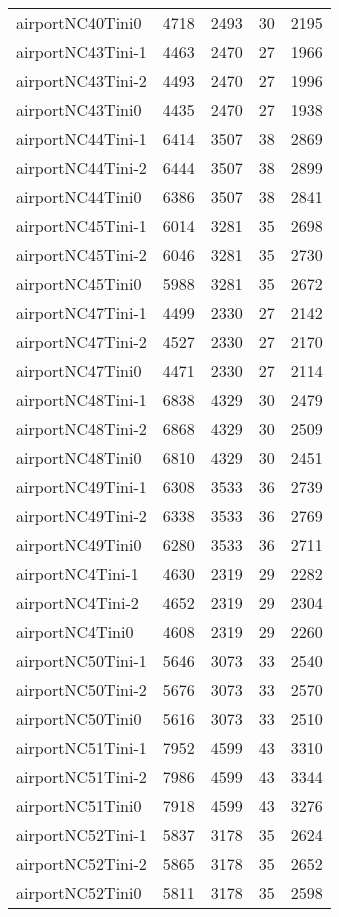 \begin{longtable}{lrrrr}
airportNC40Tini0 & 4718 & 2493 & 30 & 2195 \\
airportNC43Tini-1 & 4463 & 2470 & 27 & 1966 \\
airportNC43Tini-2 & 4493 & 2470 & 27 & 1996 \\
airportNC43Tini0 & 4435 & 2470 & 27 & 1938 \\
airportNC44Tini-1 & 6414 & 3507 & 38 & 2869 \\
airportNC44Tini-2 & 6444 & 3507 & 38 & 2899 \\
airportNC44Tini0 & 6386 & 3507 & 38 & 2841 \\
airportNC45Tini-1 & 6014 & 3281 & 35 & 2698 \\
airportNC45Tini-2 & 6046 & 3281 & 35 & 2730 \\
airportNC45Tini0 & 5988 & 3281 & 35 & 2672 \\
airportNC47Tini-1 & 4499 & 2330 & 27 & 2142 \\
airportNC47Tini-2 & 4527 & 2330 & 27 & 2170 \\
airportNC47Tini0 & 4471 & 2330 & 27 & 2114 \\
airportNC48Tini-1 & 6838 & 4329 & 30 & 2479 \\
airportNC48Tini-2 & 6868 & 4329 & 30 & 2509 \\
airportNC48Tini0 & 6810 & 4329 & 30 & 2451 \\
airportNC49Tini-1 & 6308 & 3533 & 36 & 2739 \\
airportNC49Tini-2 & 6338 & 3533 & 36 & 2769 \\
airportNC49Tini0 & 6280 & 3533 & 36 & 2711 \\
airportNC4Tini-1 & 4630 & 2319 & 29 & 2282 \\
airportNC4Tini-2 & 4652 & 2319 & 29 & 2304 \\
airportNC4Tini0 & 4608 & 2319 & 29 & 2260 \\
airportNC50Tini-1 & 5646 & 3073 & 33 & 2540 \\
airportNC50Tini-2 & 5676 & 3073 & 33 & 2570 \\
airportNC50Tini0 & 5616 & 3073 & 33 & 2510 \\
airportNC51Tini-1 & 7952 & 4599 & 43 & 3310 \\
airportNC51Tini-2 & 7986 & 4599 & 43 & 3344 \\
airportNC51Tini0 & 7918 & 4599 & 43 & 3276 \\
airportNC52Tini-1 & 5837 & 3178 & 35 & 2624 \\
airportNC52Tini-2 & 5865 & 3178 & 35 & 2652 \\
airportNC52Tini0 & 5811 & 3178 & 35 & 2598 \\

\end{longtable}
